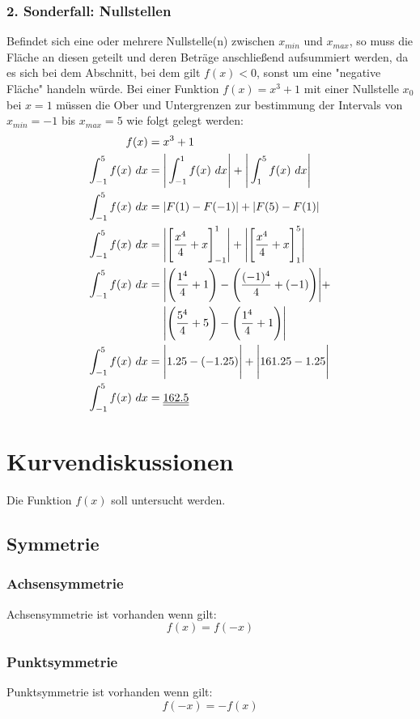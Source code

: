 \documentclass[a4paper,12pt]{article}
\begin{document}
\subsubsection{2. Sonderfall: Nullstellen}
Befindet sich eine oder mehrere Nullstelle(n) zwischen $x_{min}$ und $x_{max}$, so muss die Fläche an diesen geteilt und deren Beträge anschließend aufsummiert werden, 
da es sich bei dem Abschnitt, bei dem gilt $f(x) < 0$, sonst um eine "negative Fläche" handeln würde. Bei einer Funktion $f(x) = x^3 + 1$ mit einer Nullstelle 
$x_0$ bei $x = 1$ müssen die Ober und Untergrenzen zur bestimmung der Intervals von $x_{min} = -1$ bis $x_{max} = 5$ wie folgt gelegt werden:
\begin{equation}
\begin{split}
f(x) & = x^3 + 1\\
\int_{-1}^5 f(x)\ dx & = \Bigg{|} \int_{-1}^1 f(x)\ dx \Bigg{|} + \Bigg{|} \int_1^5 f(x)\ dx\Bigg{|}\\
\int_{-1}^5 f(x)\ dx & = | F(1) - F(-1) | + | F(5) - F(1) |\\
\int_{-1}^5 f(x)\ dx & = \Bigg{|}\Bigg{[}\frac{x^4}{4} + x\Bigg{]}_{-1}^1\Bigg{|} + \Bigg{|}\Bigg{[}\frac{x^4}{4} + x\Bigg{]}_1^5\Bigg{|}\\
\int_{-1}^5 f(x)\ dx & = \Bigg{|}\Bigg{(}\frac{1^4}{4} + 1\Bigg{)} - \Bigg{(}\frac{(-1)^4}{4} + (-1)\Bigg{)}\Bigg{|} + \\
&\ \ \ \ \Bigg{|}\Bigg{(}\frac{5^4}{4} + 5 \Bigg{)} - \Bigg{(}\frac{1^4}{4} + 1\Bigg{)}\Bigg{|}\\
\int_{-1}^5 f(x)\ dx & = \Bigg{|} 1.25 - (-1.25)\Bigg{|} + \Bigg{|} 161.25 - 1.25\Bigg{|}\\
\int_{-1}^5 f(x)\ dx & = \underline{\underline{162.5}}
\end{split}
\end{equation}
\pagebreak
\section{Kurvendiskussionen}
Die Funktion $f(x)$ soll untersucht werden.
\subsection{Symmetrie}
\subsubsection{Achsensymmetrie}
Achsensymmetrie ist vorhanden wenn gilt:
$$f(x) = f(-x)$$
\subsubsection{Punktsymmetrie}
Punktsymmetrie ist vorhanden wenn gilt:
$$f(-x) = -f(x)$$
\end{document}
